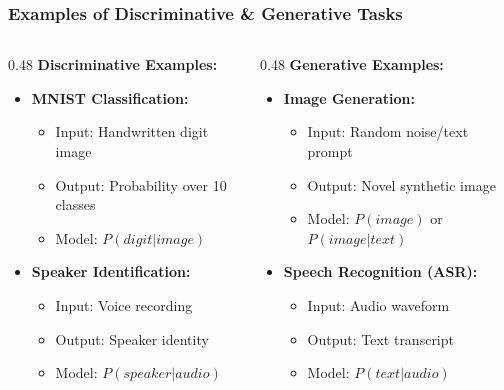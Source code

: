 \documentclass[5pt,aspectratio=169]{beamer}
\begin{document}
\begin{frame}
\frametitle{Examples of Discriminative \& Generative Tasks}
\begin{columns}
\begin{column}{0.48\textwidth}
\textbf{Discriminative Examples:}
\begin{itemize}
    \item \textbf{MNIST Classification:} 
    \begin{itemize}
        \item Input: Handwritten digit image
        \item Output: Probability over 10 classes
        \item Model: $P(digit|image)$
    \end{itemize}
    \item \textbf{Speaker Identification:}
    \begin{itemize}
        \item Input: Voice recording
        \item Output: Speaker identity
        \item Model: $P(speaker|audio)$
    \end{itemize}
\end{itemize}
\end{column}

\begin{column}{0.48\textwidth}
\textbf{Generative Examples:}
\begin{itemize}
    \item \textbf{Image Generation:}
    \begin{itemize}
        \item Input: Random noise/text prompt
        \item Output: Novel synthetic image 
        \item Model: $P(image)$ or $P(image|text)$
    \end{itemize}
    \item \textbf{Speech Recognition (ASR):}
    \begin{itemize}
        \item Input: Audio waveform
        \item Output: Text transcript
        \item Model: $P(text|audio)$
    \end{itemize}
\end{itemize}
\end{column}
\end{columns}


\end{frame}
\end{document}
